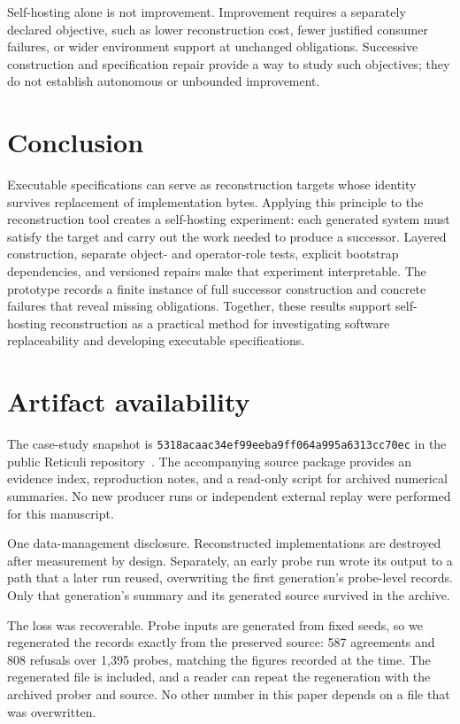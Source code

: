 \documentclass[10pt,twocolumn,letterpaper]{article}
\begin{document}
Self-hosting alone is not improvement. Improvement requires a separately declared objective, such as lower reconstruction cost, fewer justified consumer failures, or wider environment support at unchanged obligations. Successive construction and specification repair provide a way to study such objectives; they do not establish autonomous or unbounded improvement.

\section{Conclusion}
Executable specifications can serve as reconstruction targets whose identity survives replacement of implementation bytes. Applying this principle to the reconstruction tool creates a self-hosting experiment: each generated system must satisfy the target and carry out the work needed to produce a successor. Layered construction, separate object- and operator-role tests, explicit bootstrap dependencies, and versioned repairs make that experiment interpretable. The prototype records a finite instance of full successor construction and concrete failures that reveal missing obligations. Together, these results support self-hosting reconstruction as a practical method for investigating software replaceability and developing executable specifications.

\balance
\section*{Artifact availability}
The case-study snapshot is \texttt{5318acaac34ef99eeba9ff064a995a6313cc70ec} in the public Reticuli repository~\cite{repo}. The accompanying source package provides an evidence index, reproduction notes, and a read-only script for archived numerical summaries. No new producer runs or independent external replay were performed for this manuscript.

One data-management disclosure. Reconstructed implementations are destroyed after measurement by design. Separately, an early probe run wrote its output to a path that a later run reused, overwriting the first generation's probe-level records. Only that generation's summary and its generated source survived in the archive.

The loss was recoverable. Probe inputs are generated from fixed seeds, so we regenerated the records exactly from the preserved source: 587 agreements and 808 refusals over 1,395 probes, matching the figures recorded at the time. The regenerated file is included, and a reader can repeat the regeneration with the archived prober and source. No other number in this paper depends on a file that was overwritten.
\end{document}
